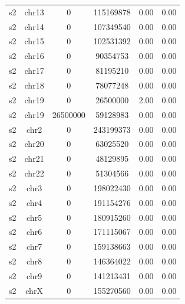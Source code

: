 \documentclass{standalone}
\begin{document}
\begin{tabular}{|l|c|c|c|c|c|}
s2 & chr13 & 0 & 115169878 & 0.00 & 0.00 \\
s2 & chr14 & 0 & 107349540 & 0.00 & 0.00 \\
s2 & chr15 & 0 & 102531392 & 0.00 & 0.00 \\
s2 & chr16 & 0 & 90354753 & 0.00 & 0.00 \\
s2 & chr17 & 0 & 81195210 & 0.00 & 0.00 \\
s2 & chr18 & 0 & 78077248 & 0.00 & 0.00 \\
s2 & chr19 & 0 & 26500000 & 2.00 & 0.00 \\
s2 & chr19 & 26500000 & 59128983 & 0.00 & 0.00 \\
s2 & chr2 & 0 & 243199373 & 0.00 & 0.00 \\
s2 & chr20 & 0 & 63025520 & 0.00 & 0.00 \\
s2 & chr21 & 0 & 48129895 & 0.00 & 0.00 \\
s2 & chr22 & 0 & 51304566 & 0.00 & 0.00 \\
s2 & chr3 & 0 & 198022430 & 0.00 & 0.00 \\
s2 & chr4 & 0 & 191154276 & 0.00 & 0.00 \\
s2 & chr5 & 0 & 180915260 & 0.00 & 0.00 \\
s2 & chr6 & 0 & 171115067 & 0.00 & 0.00 \\
s2 & chr7 & 0 & 159138663 & 0.00 & 0.00 \\
s2 & chr8 & 0 & 146364022 & 0.00 & 0.00 \\
s2 & chr9 & 0 & 141213431 & 0.00 & 0.00 \\
s2 & chrX & 0 & 155270560 & 0.00 & 0.00 \\
\hline
\end{tabular}
\end{document}
